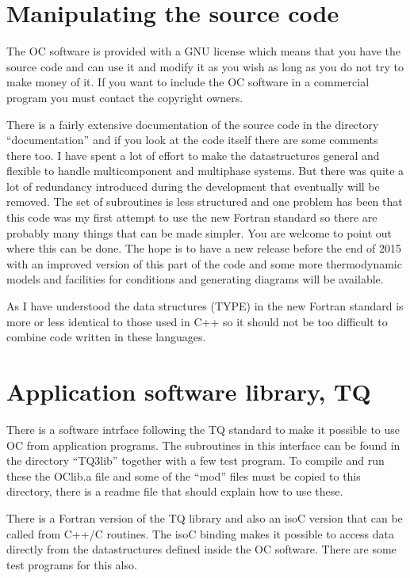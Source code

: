 \documentclass[12pt]{article}
\begin{document}
\section{Manipulating the source code}

The OC software is provided with a GNU license which means that you
have the source code and can use it and modify it as you wish as long
as you do not try to make money of it.  If you want to include the OC
software in a commercial program you must contact the copyright
owners.

There is a fairly extensive documentation of the source code in the
directory ``documentation'' and if you look at the code itself there
are some comments there too.  I have spent a lot of effort to make the
datastructures general and flexible to handle multicomponent and
multiphase systems.  But there was quite a lot of redundancy
introduced during the development that eventually will be removed.
The set of subroutines is less structured and one problem has been
that this code was my first attempt to use the new Fortran standard so
there are probably many things that can be made simpler.  You are
welcome to point out where this can be done.  The hope is to have a
new release before the end of 2015 with an improved version of this
part of the code and some more thermodynamic models and facilities for
conditions and generating diagrams will be available.

As I have understood the data structures (TYPE) in the new Fortran
standard is more or less identical to those used in C++ so it should
not be too difficult to combine code written in these languages.

\section{Application software library, TQ}

There is a software intrface following the TQ standard to make it
possible to use OC from application programs.  The subroutines in this
interface can be found in the directory ``TQ3lib'' together with a few
test program.  To compile and run these the OClib.a file and some of
the ``mod'' files must be copied to this directory, there is a readme
file that should explain how to use these.

There is a Fortran version of the TQ library and also an isoC version
that can be called from C++/C routines.  The isoC binding makes it
possible to access data directly from the datastructures defined
inside the OC software.  There are some test programs for this also.
\end{document}
